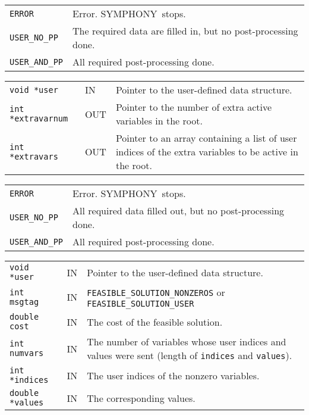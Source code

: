 \documentclass[twoside,11pt]{article}
\begin{document}
{\newpage
\clearpage
\samepage \begin{tabular}{lp{300pt}}
{\tt ERROR} & Error. {\sc SYMPHONY}\ stops. \\ 
{\tt USER\_NO\_PP} & The required data are filled in, but no
post-processing done. \\ 
{\tt USER\_AND\_PP} & All required post-processing done. \\ 
\end{tabular}
}

{\newpage
\clearpage
\samepage \begin{tabular}{llp{265pt}}
{\tt void *user} & IN & Pointer to the user-defined data structure. \\ 
{\tt int *extravarnum} & OUT & Pointer to the number of extra active
variables in the root. \\ 
{\tt int *extravars} & OUT & Pointer to an array containing a list of
user indices of the extra variables to be active in the root. \\ 
\end{tabular}
}

{\newpage
\clearpage
\samepage \begin{tabular}{lp{300pt}}
{\tt ERROR} & Error. {\sc SYMPHONY}\ stops. \\ 
{\tt USER\_NO\_PP} & All required data  filled out, but no
post-processing done. \\ 
{\tt USER\_AND\_PP} & All required post-processing done. \\ 
\end{tabular}
}

{\newpage
\clearpage
\samepage \begin{tabular}{llp{290pt}}
{\tt void *user} & IN & Pointer to the user-defined data structure. \\ 
{\tt int msgtag} &    IN & {\tt FEASIBLE\_SOLUTION\_NONZEROS} or {\tt
FEASIBLE\_SOLUTION\_USER} \\ 
{\tt double cost}  &    IN & The cost of the feasible solution.\\ 
{\tt int numvars} &  IN & The number of variables whose user indices and
values were sent (length of {\tt indices} and {\tt values}). \\ 
{\tt int *indices} &  IN & The user indices of the nonzero variables. \\ 
{\tt double *values} & IN & The corresponding values. \\ 
\end{tabular}
}
\end{document}

